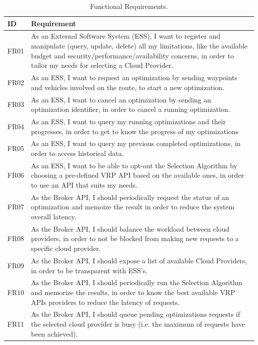 \begin{table}
    \centering
    \caption{Functional Requirements.}
    \label{tab:req_func}
    \begin{tabular}{p{.8cm}|p{6.5cm}}
        \hline
        ID & Requirement \\
        \hline
        
        {\small FR01} & {\small As an External Software System (ESS), I want to register and manipulate (query, update, delete) all my limitations, like the available budget and security/performance/availability concerns, in order to tailor my needs for selecting a Cloud Provider.} \\
        {\small FR02} & {\small As an ESS, I want to request an optimization by sending waypoints and vehicles involved on the route, to start a new optimization.} \\
        {\small FR03} & {\small As an ESS, I want to cancel an optimization by sending an optimization identifier, in order to cancel a running optimization.} \\
        {\small FR04} & {\small As an ESS, I want to query my running optimizations and their progresses, in order to get to know the progress of my optimizations} \\
        {\small FR05} & {\small As an ESS, I want to query my previous completed optimizations, in order to access historical data.} \\
        {\small FR06} & {\small As an ESS, I want to be able to opt-out the Selection Algorithm by choosing a pre-defined VRP API based on the available ones, in order to use an API that suits my needs.} \\
        {\small FR07} & {\small As the Broker API, I should periodically request the status of an optimization and memoize the result in order to reduce the system overall latency.} \\
        {\small FR08} & {\small As the Broker API, I should balance the workload between cloud providers, in order to not be blocked from making new requests to a specific cloud provider.} \\
        {\small FR09} & {\small As the Broker API, I should expose a list of available Cloud Providers, in order to be transparent with ESS's.} \\
        {\small FR10} & {\small As the Broker API, I should periodically run the Selection Algorithm and memorize the results, in order to know the best available VRP APIs providers to reduce the latency of requests.} \\
        {\small FR11} & {\small As the Broker API, I should queue pending optimizations requests if the selected cloud provider is busy (i.e. the maximum of requests have been achieved).} \\
        \hline
    \end{tabular}
    
\end{table}


